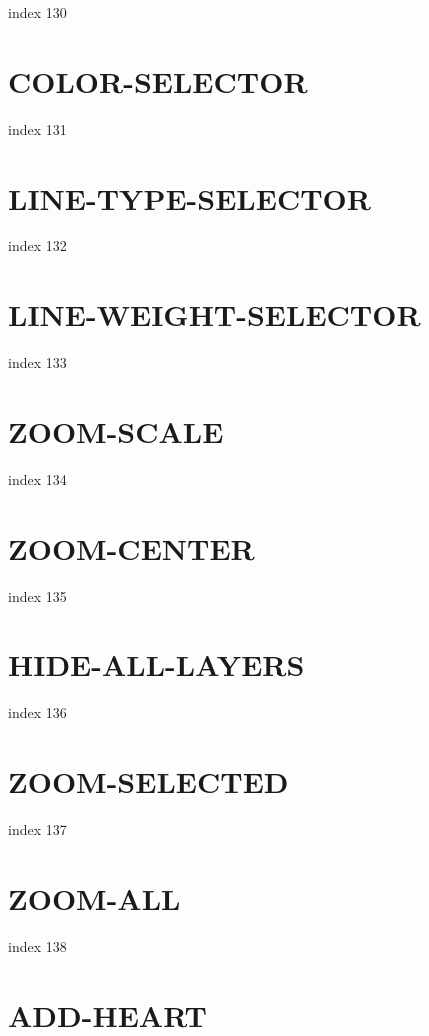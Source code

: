 \documentclass[10pt]{report}
\begin{document}
index 130

\section{COLOR-SELECTOR}

index 131

\section{LINE-TYPE-SELECTOR}

index 132

\section{LINE-WEIGHT-SELECTOR}

index 133

\section{ZOOM-SCALE}

index 134

\section{ZOOM-CENTER}

index 135

\section{HIDE-ALL-LAYERS}

index 136

\section{ZOOM-SELECTED}

index 137

\section{ZOOM-ALL}

index 138

\section{ADD-HEART}
\end{document}
